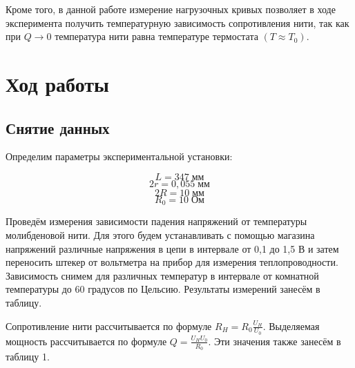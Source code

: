 \documentclass[a4paper, 12pt]{article} %
\begin{document}
Кроме того, в данной работе измерение нагрузочных кривых позволяет в ходе эксперимента получить температурную зависимость сопротивления нити, так как при $Q \rightarrow 0$ температура нити равна температуре
термостата $(T \approx T_0)$.

\section{Ход работы}

\subsection{Снятие данных}

Определим параметры экспериментальной установки:
     
\[L    = 347   \; \text{мм} \]
\[2r = 0,055 \; \text{мм} \]
\[2R = 10    \; \text{мм} \]
\[R_0  = 10    \; \text{Ом} \]        
     
Проведём измерения зависимости падения напряжений от температуры молибденовой нити. Для этого будем устанавливать с помощью магазина напряжений различные напряжения в цепи в интервале от 0,1 до 1,5 В и затем переносить штекер от вольтметра на прибор для измерения теплопроводности. Зависимость снимем для различных температур в интервале от комнатной температуры до 60 градусов по Цельсию. Результаты измерений занесём в таблицу.
     
Сопротивление нити рассчитывается по формуле $R_H = R_0 \frac{U_H}{U_0}$. Выделяемая мощность рассчитывается по формуле $Q = \frac{U_H U_0}{R_0}$. Эти значения также занесём в таблицу 1.
\end{document}
